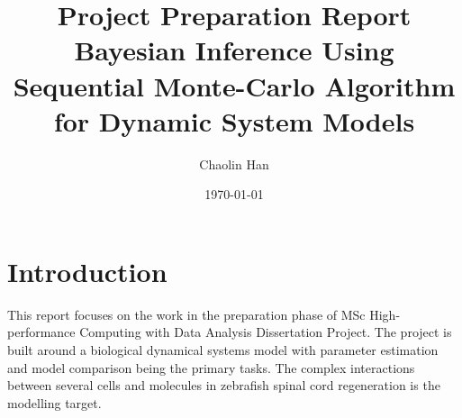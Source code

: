 \documentclass{article}
\begin{document}

\title{Project Preparation Report\\Bayesian Inference Using Sequential Monte-Carlo Algorithm for Dynamic System Models}
\author{Chaolin Han}
\date{\today}

\makeEPCCtitle

\newpage

\tableofcontents









\newpage
{}

\section{Introduction}

This report focuses on the work in the preparation phase of 
MSc High-performance Computing with Data Analysis Dissertation Project. 
The project is built around 
a biological dynamical systems model with parameter estimation and model comparison 
being the
primary tasks. The complex interactions between several cells and molecules
in zebrafish spinal cord regeneration is the modelling target.
\end{document}
